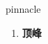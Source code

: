 
\begin{frame}
{\huge pinnacle}
\begin{center}
\begin{enumerate}\Large
  \item \textbf{顶峰}
\end{enumerate}
\end{center}
\end{frame}
